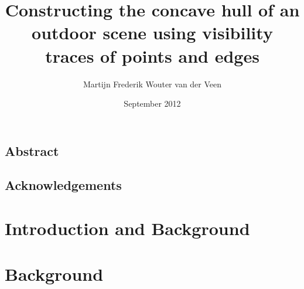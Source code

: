 \documentclass{ucl_thesis}
\title{Constructing the concave hull of an outdoor scene
       using visibility traces of points and edges}
\author{Martijn Frederik Wouter van der Veen}
\date{September 2012}
\begin{document}

\maketitle
{}
\setcounter{page}{1}
\pagestyle{plain}





\newpage
\section*{Abstract}
%


\newpage
\section*{Acknowledgements}

\tableofcontents
\listoffigures
\listofalgorithms
\newpage

%

\setcounter{page}{1}
\pagestyle{plain}




\chapter{Introduction and Background}
\label{introduction}
%



\chapter{Background}
\label{background}
%
\end{document}
